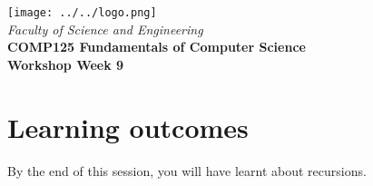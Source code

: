 \usepackage[T1]{fontenc}
\usepackage{pslatex}
 \usepackage[pdftex]{color}  
 \usepackage[pdftex]{graphicx}     
\usepackage{verbatim}
\usepackage{xcolor}
\usepackage{paralist}
\usepackage{tagging}

\usepackage[colorlinks=true,urlcolor=red]{hyperref}
\setlength{\topmargin}{-0.5in}                  %
\setlength{\textheight}{9.5in}                  %
\setlength{\oddsidemargin}{0in}                 %
\setlength{\evensidemargin}{0in}                %
\setlength{\textwidth}{6.5in}                   %
\setlength{\parindent}{0.0in}
\newcommand{\code}{\texttt}

\usepackage{listings}




%
\vspace{0.2in}
\begin{center}
        {\large  %
\texttt{[image: ../../logo.png]}\\
\medskip
        {\it  Faculty of Science and Engineering\\}
        \vspace{0.2in}
         {\bf COMP125 Fundamentals of Computer Science\\
        Workshop Week 9\\}}
\end{center}
\vspace{0.3in}
%

\renewcommand{\labelenumi}{\alph{enumi}.}
 
\section* {Learning outcomes}

By the end of this session, you will have learnt about recursions. 



